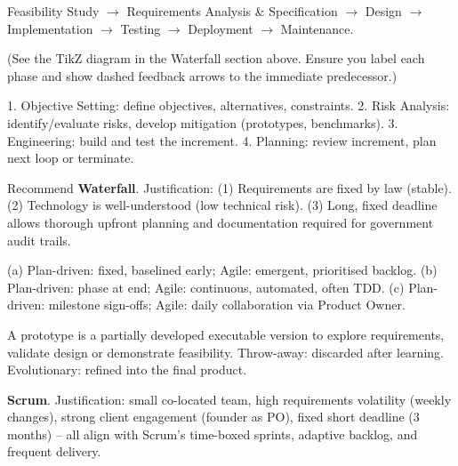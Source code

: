 \documentclass[11pt]{article}
\begin{document}
\begin{corrige}[Exercise 2]
Feasibility Study $\to$ Requirements Analysis \& Specification $\to$ Design $\to$ Implementation $\to$ Testing $\to$ Deployment $\to$ Maintenance.
\end{corrige}

\begin{corrige}[Exercise 3]
(See the TikZ diagram in the Waterfall section above. Ensure you label each phase and show dashed feedback arrows to the immediate predecessor.)
\end{corrige}

\begin{corrige}[Exercise 4]
1. Objective Setting: define objectives, alternatives, constraints. 2. Risk Analysis: identify/evaluate risks, develop mitigation (prototypes, benchmarks). 3. Engineering: build and test the increment. 4. Planning: review increment, plan next loop or terminate.
\end{corrige}

\begin{corrige}[Exercise 5]
Recommend \textbf{Waterfall}. Justification: (1) Requirements are fixed by law (stable). (2) Technology is well-understood (low technical risk). (3) Long, fixed deadline allows thorough upfront planning and documentation required for government audit trails.
\end{corrige}

\begin{corrige}[Exercise 6]
(a) Plan-driven: fixed, baselined early; Agile: emergent, prioritised backlog. (b) Plan-driven: phase at end; Agile: continuous, automated, often TDD. (c) Plan-driven: milestone sign-offs; Agile: daily collaboration via Product Owner.
\end{corrige}

\begin{corrige}[Exercise 7]
A prototype is a partially developed executable version to explore requirements, validate design or demonstrate feasibility. Throw-away: discarded after learning. Evolutionary: refined into the final product.
\end{corrige}

\begin{corrige}[Exercise 8]
\textbf{Scrum}. Justification: small co-located team, high requirements volatility (weekly changes), strong client engagement (founder as PO), fixed short deadline (3 months) -- all align with Scrum's time-boxed sprints, adaptive backlog, and frequent delivery.
\end{corrige}
\end{document}
